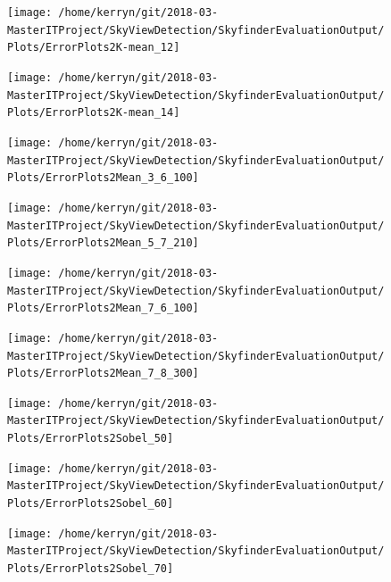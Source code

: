 \documentclass[final,3p,times,authoryear]{elsarticle}
\begin{document}
\begin{figure}
\centering
\texttt{[image: /home/kerryn/git/2018-03-MasterITProject/SkyViewDetection/SkyfinderEvaluationOutput/Plots/ErrorPlots2K-mean\_12]}
\caption{}
\label{fig:errorplots2k-mean12}
\end{figure}
\begin{figure}
\centering
\texttt{[image: /home/kerryn/git/2018-03-MasterITProject/SkyViewDetection/SkyfinderEvaluationOutput/Plots/ErrorPlots2K-mean\_14]}
\caption{}
\label{fig:errorplots2k-mean14}
\end{figure}
\begin{figure}
\centering
\texttt{[image: /home/kerryn/git/2018-03-MasterITProject/SkyViewDetection/SkyfinderEvaluationOutput/Plots/ErrorPlots2Mean\_3\_6\_100]}
\caption{}
\label{fig:errorplots2mean36100}
\end{figure}
\begin{figure}
\centering
\texttt{[image: /home/kerryn/git/2018-03-MasterITProject/SkyViewDetection/SkyfinderEvaluationOutput/Plots/ErrorPlots2Mean\_5\_7\_210]}
\caption{}
\label{fig:errorplots2mean57210}
\end{figure}
\begin{figure}
\centering
\texttt{[image: /home/kerryn/git/2018-03-MasterITProject/SkyViewDetection/SkyfinderEvaluationOutput/Plots/ErrorPlots2Mean\_7\_6\_100]}
\caption{}
\label{fig:errorplots2mean76100}
\end{figure}
\begin{figure}
\centering
\texttt{[image: /home/kerryn/git/2018-03-MasterITProject/SkyViewDetection/SkyfinderEvaluationOutput/Plots/ErrorPlots2Mean\_7\_8\_300]}
\caption{}
\label{fig:errorplots2mean78300}
\end{figure}
\begin{figure}
\centering
\texttt{[image: /home/kerryn/git/2018-03-MasterITProject/SkyViewDetection/SkyfinderEvaluationOutput/Plots/ErrorPlots2Sobel\_50]}
\caption{}
\label{fig:errorplots2sobel50}
\end{figure}
\begin{figure}
\centering
\texttt{[image: /home/kerryn/git/2018-03-MasterITProject/SkyViewDetection/SkyfinderEvaluationOutput/Plots/ErrorPlots2Sobel\_60]}
\caption{}
\label{fig:errorplots2sobel60}
\end{figure}
\begin{figure}
\centering
\texttt{[image: /home/kerryn/git/2018-03-MasterITProject/SkyViewDetection/SkyfinderEvaluationOutput/Plots/ErrorPlots2Sobel\_70]}
\caption{}
\label{fig:errorplots2sobel70}
\end{figure}
\end{document}
